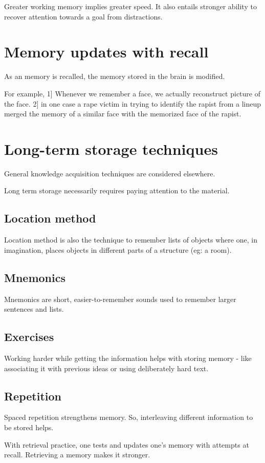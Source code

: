 \documentclass[oneside, article]{memoir}
\begin{document}
Greater working memory implies greater speed. It also entails stronger ability to recover attention towards a goal from distractions.

\section{Memory updates with recall}
As an memory is recalled, the memory stored in the brain is modified.

For example, 1] Whenever we remember a face, we actually reconstruct picture of the face. 2] in one case a rape victim in trying to identify the rapist from a lineup merged the memory of a similar face with the memorized face of the rapist.

\section{Long-term storage techniques}
General knowledge acquisition techniques are considered elsewhere.

Long term storage necessarily requires paying attention to the material.

\subsection{Location method}
Location method is also the technique to remember lists of objects where one, in imagination, places objects in different parts of a structure (eg: a room).

\subsection{Mnemonics}
Mnemonics are short, easier-to-remember sounds used to remember larger sentences and lists.

\subsection{Exercises}
Working harder while getting the information helps with storing memory - like associating it with previous ideas or using deliberately hard text.

\subsection{Repetition}
Spaced repetition strengthens memory. So, interleaving different information to be stored helps.

With retrieval practice, one tests and updates one's memory with attempts at recall. Retrieving a memory makes it stronger.
\end{document}
